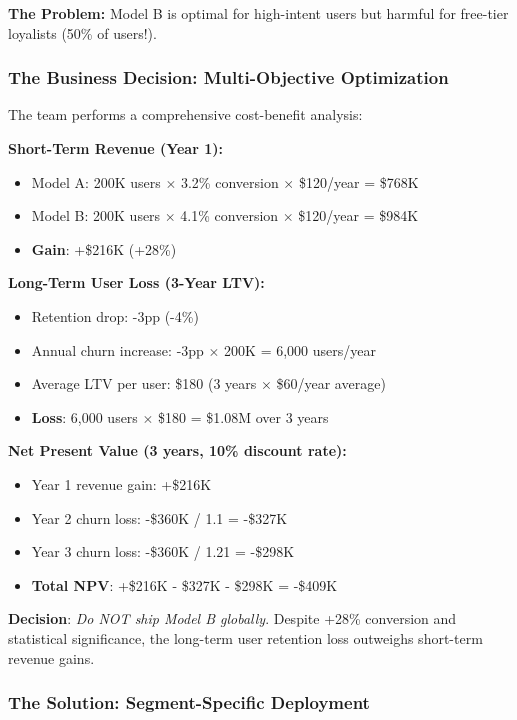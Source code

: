 \textbf{The Problem:} Model B is optimal for high-intent users but harmful for free-tier loyalists (50\% of users!).

\subsubsection{The Business Decision: Multi-Objective Optimization}

The team performs a comprehensive cost-benefit analysis:

\textbf{Short-Term Revenue (Year 1):}
\begin{itemize}
    \item Model A: 200K users $\times$ 3.2\% conversion $\times$ \$120/year = \$768K
    \item Model B: 200K users $\times$ 4.1\% conversion $\times$ \$120/year = \$984K
    \item \textbf{Gain}: +\$216K (+28\%)
\end{itemize}

\textbf{Long-Term User Loss (3-Year LTV):}
\begin{itemize}
    \item Retention drop: -3pp (-4\%)
    \item Annual churn increase: -3pp $\times$ 200K = 6,000 users/year
    \item Average LTV per user: \$180 (3 years $\times$ \$60/year average)
    \item \textbf{Loss}: 6,000 users $\times$ \$180 = \$1.08M over 3 years
\end{itemize}

\textbf{Net Present Value (3 years, 10\% discount rate):}
\begin{itemize}
    \item Year 1 revenue gain: +\$216K
    \item Year 2 churn loss: -\$360K / 1.1 = -\$327K
    \item Year 3 churn loss: -\$360K / 1.21 = -\$298K
    \item \textbf{Total NPV}: +\$216K - \$327K - \$298K = -\$409K
\end{itemize}

\textbf{Decision}: \textit{Do NOT ship Model B globally}. Despite +28\% conversion and statistical significance, the long-term user retention loss outweighs short-term revenue gains.

\subsubsection{The Solution: Segment-Specific Deployment}

